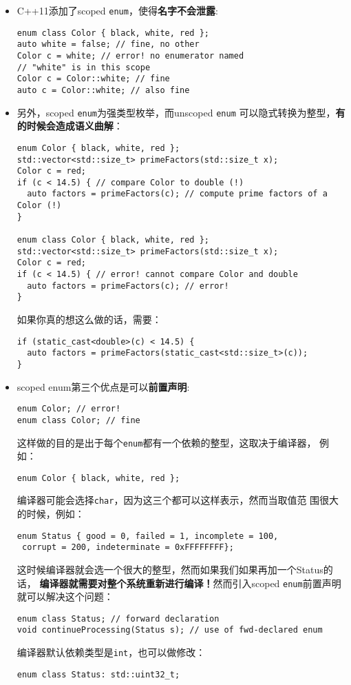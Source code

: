 \begin{itemize}
\item C++11添加了scoped \texttt{enum}，使得\textbf{名字不会泄露}:
\begin{verbatim}
enum class Color { black, white, red };
auto white = false; // fine, no other
Color c = white; // error! no enumerator named
// "white" is in this scope
Color c = Color::white; // fine
auto c = Color::white; // also fine
\end{verbatim}
\item 另外，scoped \texttt{enum}为强类型枚举，而unscoped \texttt{enum}
  可以隐式转换为整型，\textbf{有的时候会造成语义曲解}：
\begin{verbatim}
enum Color { black, white, red }; 
std::vector<std::size_t> primeFactors(std::size_t x); 
Color c = red;
if (c < 14.5) { // compare Color to double (!)
  auto factors = primeFactors(c); // compute prime factors of a Color (!)
}

enum class Color { black, white, red }; 
std::vector<std::size_t> primeFactors(std::size_t x); 
Color c = red;
if (c < 14.5) { // error! cannot compare Color and double
  auto factors = primeFactors(c); // error!
}
\end{verbatim}
如果你真的想这么做的话，需要：
\begin{verbatim}
if (static_cast<double>(c) < 14.5) {
  auto factors = primeFactors(static_cast<std::size_t>(c)); 
}
\end{verbatim}
\item scoped enum第三个优点是可以\textbf{前置声明}:
\begin{verbatim}
enum Color; // error!
enum class Color; // fine
\end{verbatim}
这样做的目的是出于每个\texttt{enum}都有一个依赖的整型，这取决于编译器，
例如：
\begin{verbatim}
enum Color { black, white, red };
\end{verbatim}
编译器可能会选择\texttt{char}，因为这三个都可以这样表示，然而当取值范
围很大的时候，例如：
\begin{verbatim}
enum Status { good = 0, failed = 1, incomplete = 100,
 corrupt = 200, indeterminate = 0xFFFFFFFF};
\end{verbatim}
这时候编译器就会选一个很大的整型，然而如果我们如果再加一个Status的话，
\textbf{编译器就需要对整个系统重新进行编译！}然而引入scoped
\texttt{enum}前置声明就可以解决这个问题：
\begin{verbatim}
enum class Status; // forward declaration
void continueProcessing(Status s); // use of fwd-declared enum
\end{verbatim}
编译器默认依赖类型是\texttt{int}，也可以做修改：
\begin{verbatim}
enum class Status: std::uint32_t;
\end{verbatim}
\end{itemize}


